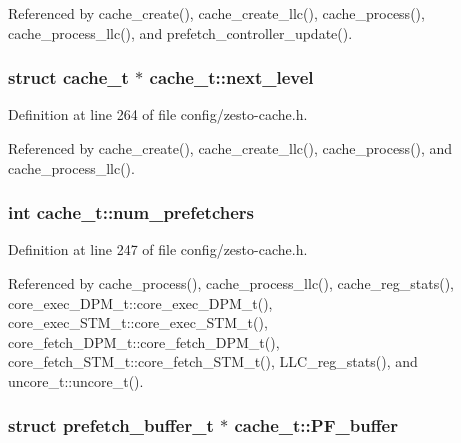 Referenced by cache\_\-create(), cache\_\-create\_\-llc(), cache\_\-process(), cache\_\-process\_\-llc(), and prefetch\_\-controller\_\-update().
\subsubsection[{next\_\-level}]{\setlength{\rightskip}{0pt plus 5cm}struct {\bf cache\_\-t} $\ast$ {\bf cache\_\-t::next\_\-level}\hspace{0.3cm}{\tt  [read]}}\label{structcache__t_7e1aa88ae0c044d1ee11bbb80070cd47}




Definition at line 264 of file config/zesto-cache.h.

Referenced by cache\_\-create(), cache\_\-create\_\-llc(), cache\_\-process(), and cache\_\-process\_\-llc().
\subsubsection[{num\_\-prefetchers}]{\setlength{\rightskip}{0pt plus 5cm}int {\bf cache\_\-t::num\_\-prefetchers}}\label{structcache__t_9c4419121e831734dd6e738ddddb4d2e}




Definition at line 247 of file config/zesto-cache.h.

Referenced by cache\_\-process(), cache\_\-process\_\-llc(), cache\_\-reg\_\-stats(), core\_\-exec\_\-DPM\_\-t::core\_\-exec\_\-DPM\_\-t(), core\_\-exec\_\-STM\_\-t::core\_\-exec\_\-STM\_\-t(), core\_\-fetch\_\-DPM\_\-t::core\_\-fetch\_\-DPM\_\-t(), core\_\-fetch\_\-STM\_\-t::core\_\-fetch\_\-STM\_\-t(), LLC\_\-reg\_\-stats(), and uncore\_\-t::uncore\_\-t().
\subsubsection[{PF\_\-buffer}]{\setlength{\rightskip}{0pt plus 5cm}struct {\bf prefetch\_\-buffer\_\-t} $\ast$ {\bf cache\_\-t::PF\_\-buffer}\hspace{0.3cm}{\tt  [read]}}\label{structcache__t_5d065cf815d558755a20bc7cd9578b9b}




